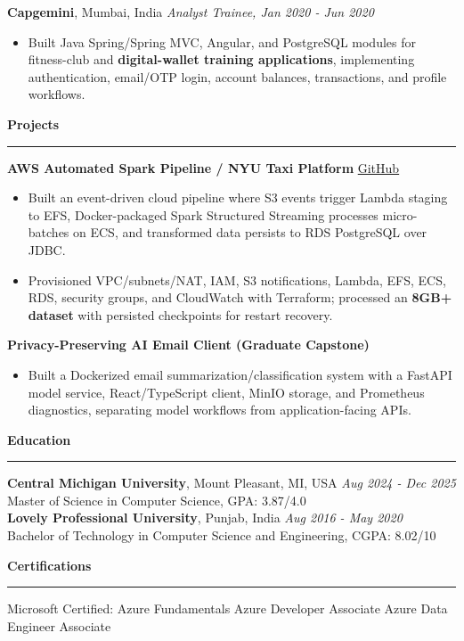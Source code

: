 \documentclass[11pt,letterpaper]{article}
\newcommand{\ressection}[1]{\Needspace{6\baselineskip}\vspace{8pt}\par\textbf{#1}\par\vspace{2pt}\hrule\vspace{5pt}}
\begin{document}
\textbf{Capgemini}, Mumbai, India \hfill \textit{Analyst Trainee, Jan 2020 - Jun 2020}
\begin{itemize}
  \item Built Java Spring/Spring MVC, Angular, and PostgreSQL modules for fitness-club and \textbf{digital-wallet training applications}, implementing authentication, email/OTP login, account balances, transactions, and profile workflows.
\end{itemize}

\ressection{Projects}
\textbf{AWS Automated Spark Pipeline / NYU Taxi Platform} \hfill \href{https://github.com/preferablehuman/AWS-automated-spark-pipeline}{GitHub}
\begin{itemize}
  \item Built an event-driven cloud pipeline where S3 events trigger Lambda staging to EFS, Docker-packaged Spark Structured Streaming processes micro-batches on ECS, and transformed data persists to RDS PostgreSQL over JDBC.
  \item Provisioned VPC/subnets/NAT, IAM, S3 notifications, Lambda, EFS, ECS, RDS, security groups, and CloudWatch with Terraform; processed an \textbf{8GB+ dataset} with persisted checkpoints for restart recovery.
\end{itemize}
\vspace{2pt}
\textbf{Privacy-Preserving AI Email Client (Graduate Capstone)}
\begin{itemize}
  \item Built a Dockerized email summarization/classification system with a FastAPI model service, React/TypeScript client, MinIO storage, and Prometheus diagnostics, separating model workflows from application-facing APIs.
\end{itemize}

\ressection{Education}
\textbf{Central Michigan University}, Mount Pleasant, MI, USA \hfill \textit{Aug 2024 - Dec 2025}\\
Master of Science in Computer Science, GPA: 3.87/4.0\\
\textbf{Lovely Professional University}, Punjab, India \hfill \textit{Aug 2016 - May 2020}\\
Bachelor of Technology in Computer Science and Engineering, CGPA: 8.02/10

\ressection{Certifications}
Microsoft Certified: Azure Fundamentals \textbar{} Azure Developer Associate \textbar{} Azure Data Engineer Associate
\end{document}
